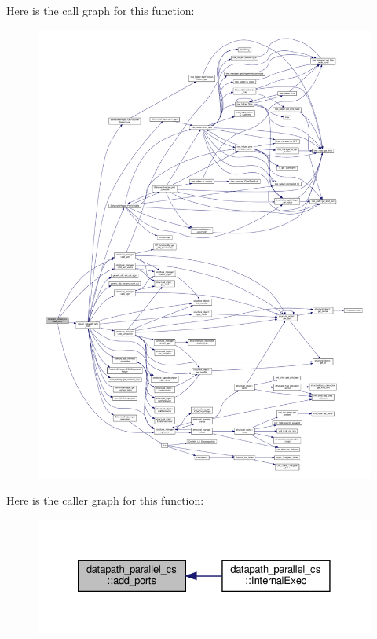 Here is the call graph for this function\+:
\nopagebreak
\begin{figure}[H]
\begin{center}
\leavevmode
\includegraphics[width=350pt]{d7/d60/classdatapath__parallel__cs_af4ae83a9ee67fb9c5f2cdc6f7f5678a4_cgraph}
\end{center}
\end{figure}
Here is the caller graph for this function\+:
\nopagebreak
\begin{figure}[H]
\begin{center}
\leavevmode
\includegraphics[width=328pt]{d7/d60/classdatapath__parallel__cs_af4ae83a9ee67fb9c5f2cdc6f7f5678a4_icgraph}
\end{center}
\end{figure}
\mbox{\label{classdatapath__parallel__cs_a8ddd2d2e3b0f6b9d6ee635cb4a52beb7}} 
